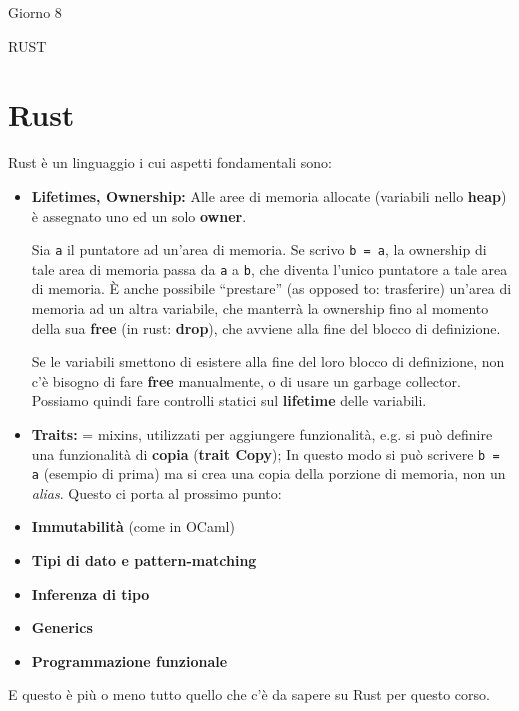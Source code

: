 \documentclass[a4paper,10pt]{article}
\begin{document}
\begin{center}
    \LARGE Giorno 8\smallskip

    \Large RUST
\end{center}\smallskip


\section{Rust}
Rust è un linguaggio i cui aspetti fondamentali sono:

\begin{itemize}
 \item \textbf{Lifetimes, Ownership:} Alle aree di memoria allocate (variabili nello \textbf{heap}) è assegnato uno ed un solo \textbf{owner}.
 
 Sia \texttt{a} il puntatore ad un'area di memoria. Se scrivo \texttt{b = a}, la ownership di tale area di memoria passa da \texttt{a} a \texttt{b}, che diventa l'unico puntatore a tale area di memoria. È anche possibile ``prestare'' (as opposed to: trasferire) un'area di memoria ad un altra variabile, che manterrà la ownership fino al momento della sua \textbf{free} (in rust: \textbf{drop}), che avviene alla fine del blocco di definizione.\smallskip
 
 Se le variabili smettono di esistere alla fine del loro blocco di definizione, non c'è bisogno di fare \textbf{free} manualmente, o di usare un garbage collector. Possiamo quindi fare controlli statici sul \textbf{lifetime} delle variabili.

 \item \textbf{Traits:} = mixins, utilizzati per aggiungere funzionalità, e.g. si può definire una funzionalità di \textbf{copia} (\textbf{trait Copy}); In questo modo si può scrivere \texttt{b = a} (esempio di prima) ma si crea una copia della porzione di memoria, non un \emph{alias}. Questo ci porta al prossimo punto:
 \item \textbf{Immutabilità} (come in OCaml)
 \item \textbf{Tipi di dato e pattern-matching}
 \item \textbf{Inferenza di tipo}
 \item \textbf{Generics}
 \item \textbf{Programmazione funzionale}
 
 
 
 \end{itemize}

 E questo è più o meno tutto quello che c'è da sapere su Rust per questo corso.
\end{document}
